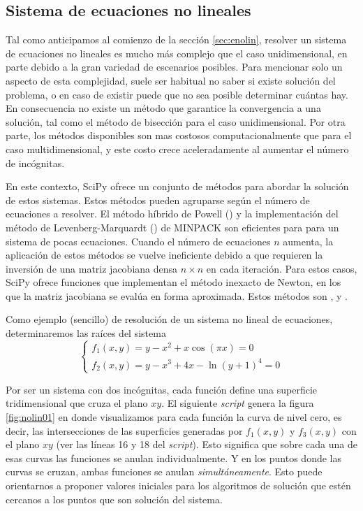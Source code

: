 \subsection{Sistema de ecuaciones no lineales}
Tal como anticipamos al comienzo de la sección \ref{sec:enolin}, resolver un sistema de ecuaciones no lineales es mucho más complejo que el caso unidimensional, en parte debido a la gran variedad de escenarios posibles. Para mencionar solo un aspecto de esta complejidad, suele ser habitual no saber si existe solución del problema, o en caso de existir puede que no sea posible determinar cuántas hay. En consecuencia no existe un método que garantice la convergencia a una solución, tal como el método de bisección para el caso unidimensional. Por otra parte, los métodos disponibles son mas costosos computacionalmente que para el caso multidimensional, y este costo crece aceleradamente al aumentar el número de incógnitas.

En este contexto, SciPy ofrece un conjunto de métodos para abordar la solución de estos sistemas. Estos métodos pueden agruparse según el número de ecuaciones a resolver. El método híbrido de Powell () y la implementación del método de Levenberg-Marquardt () de MINPACK son eficientes para para un sistema de pocas ecuaciones. Cuando el número de ecuaciones $n$ aumenta, la aplicación de estos métodos se vuelve ineficiente debido a que requieren la inversión de una matriz jacobiana densa $n \times n$ en cada iteración. Para estos casos, SciPy ofrece funciones que implementan el método inexacto de Newton, en los que la matriz jacobiana se evalúa en forma aproximada. Estos métodos son ,  y .

Como ejemplo (sencillo) de resolución de un sistema no lineal de ecuaciones, determinaremos las raíces del sistema
\begin{equation} \label{eq:nolin02}
 \begin{cases}
  f_1(x, y) = y -x^2 + x \cos( \pi x)  = 0\\
  f_2(x, y) = y - x^3 + 4 x - \ln\left( y + 1 \right)^4 = 0
 \end{cases}
\end{equation} 

Por ser un sistema con dos incógnitas, cada función define una superficie tridimensional que cruza el plano $xy$. El siguiente \textit{script} genera la figura \ref{fig:nolin01} en donde visualizamos para cada función la curva de nivel cero, es decir, las intersecciones de las superficies generadas por $f_1(x,y)$ y $f_3(x,y)$ con el plano $xy$ (ver las líneas 16 y 18 del \textit{script}). Esto significa que sobre cada una de esas curvas las funciones se anulan individualmente. Y en los puntos donde las curvas se cruzan, ambas funciones se anulan \textit{simultáneamente}. Esto puede orientarnos a proponer valores iniciales para los algoritmos de solución que estén cercanos a los puntos que son solución del sistema. 

